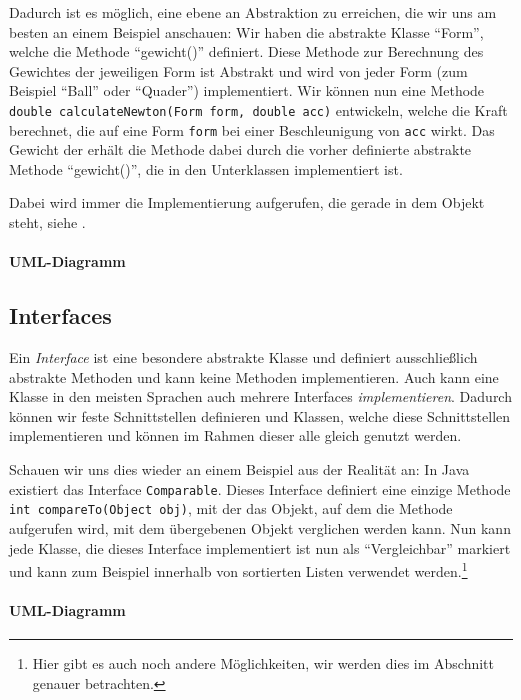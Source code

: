 	Dadurch ist es möglich, eine ebene an Abstraktion zu erreichen, die wir uns am besten an einem Beispiel anschauen: Wir haben die abstrakte Klasse \enquote{Form}, welche die Methode \enquote{gewicht()} definiert. Diese Methode zur Berechnung des Gewichtes der jeweiligen Form ist Abstrakt und wird von jeder Form (zum Beispiel \enquote{Ball} oder \enquote{Quader}) implementiert. Wir können nun eine Methode \lstinline|double calculateNewton(Form form, double acc)| entwickeln, welche die Kraft berechnet, die auf eine Form \texttt{form} bei einer Beschleunigung von \texttt{acc} wirkt. Das Gewicht der erhält die Methode dabei durch die vorher definierte abstrakte Methode \enquote{gewicht()}, die in den Unterklassen implementiert ist.
	
	Dabei wird immer die Implementierung aufgerufen, die gerade in dem Objekt steht, siehe .
	
	\paragraph{UML-Diagramm}

\subsection{Interfaces} \imperativeMark \oopMark
	Ein \textit{Interface} ist eine besondere abstrakte Klasse und definiert ausschließlich abstrakte Methoden und kann keine Methoden implementieren. Auch kann eine Klasse in den meisten Sprachen auch mehrere Interfaces \textit{implementieren}. Dadurch können wir feste Schnittstellen definieren und Klassen, welche diese Schnittstellen implementieren und können im Rahmen dieser alle gleich genutzt werden.
	
	Schauen wir uns dies wieder an einem Beispiel aus der Realität an: In Java existiert das Interface \lstinline|Comparable|. Dieses Interface definiert eine einzige Methode \lstinline|int compareTo(Object obj)|, mit der das Objekt, auf dem die Methode aufgerufen wird, mit dem übergebenen Objekt verglichen werden kann. Nun kann jede Klasse, die dieses Interface implementiert ist nun als \enquote{Vergleichbar} markiert und kann zum Beispiel innerhalb von sortierten Listen verwendet werden.\footnote{Hier gibt es auch noch andere Möglichkeiten, wir werden dies im Abschnitt  genauer betrachten.}
	
	\paragraph{UML-Diagramm}


